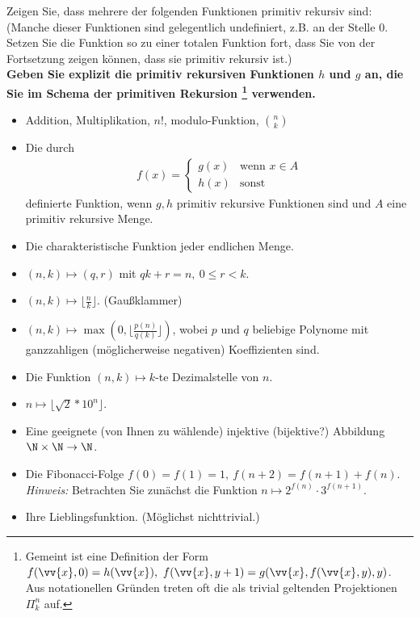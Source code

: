 
\begin{exercise}[194 + 195]

Zeigen Sie, dass mehrere der folgenden Funktionen primitiv rekursiv sind:
(Manche dieser Funktionen sind gelegentlich undefiniert, z.B. an der Stelle $0$.
Setzen Sie die Funktion so zu einer totalen Funktion fort, dass Sie von der
Fortsetzung zeigen können, dass sie primitiv rekursiv ist.) \\

\textbf{Geben Sie explizit die primitiv rekursiven Funktionen $h$ und $g$ an,
die Sie im Schema der primitiven Rekursion
\footnote{Gemeint ist eine Definition der Form $f(\vv{x},0) = h(\vv{x}),\
f(\vv{x}, y + 1) = g(\vv{x}, f(\vv{x},y), y)$. Aus notationellen Gründen
treten oft die als trivial geltenden Projektionen $\Pi_k^n$ auf.}
verwenden.}

\begin{itemize}
	\item Addition, Multiplikation, $n!$, modulo-Funktion, $\binom{n}{k}$
	\item Die durch
	\begin{align*}
		f(x) = \begin{cases}
			g(x) & \text{wenn } x \in A \\
			h(x) & \text{sonst}
		\end{cases}
	\end{align*}
	definierte Funktion, wenn $g,h$ primitiv rekursive Funktionen sind und $A$
	eine primitiv rekursive Menge.
	\item Die charakteristische Funktion jeder endlichen Menge.
	\item $(n,k) \mapsto (q,r)$ mit $qk + r = n,\ 0 \leq r < k$.
	\item $(n,k) \mapsto \lfloor \frac{n}{k} \rfloor$. (Gaußklammer)
	\item $(n,k) \mapsto \max(0, \lfloor \frac{p(n)}{q(k)}\rfloor)$,
	wobei $p$ und $q$ beliebige Polynome mit ganzzahligen (möglicherweise
	negativen) Koeffizienten sind.
	\item Die Funktion $(n,k) \mapsto k$-te Dezimalstelle von $n$.
	\item $n \mapsto \lfloor \sqrt{2}*10^n\rfloor$.
	\item Eine geeignete (von Ihnen zu wählende) injektive (bijektive?) Abbildung
	$\N \times \N \to \N$.
	\item Die Fibonacci-Folge $f(0) = f(1) = 1,\ f(n+2) = f(n+1) + f(n)$.\\
	\textit{Hinweis:} Betrachten Sie zunächst die Funktion $n \mapsto 2^{f(n)}\cdot 3^{f(n+1)}$.
	\item Ihre Lieblingsfunktion. (Möglichst nichttrivial.)

\end{itemize}

\end{exercise}

